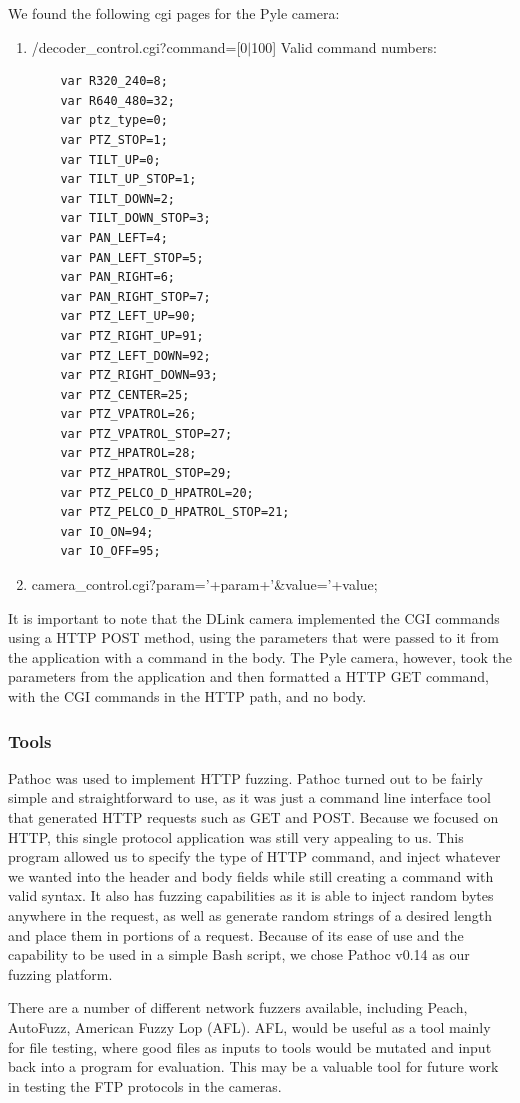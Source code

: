 \documentclass[letterpaper,twocolumn,10pt]{article}
\begin{document}
We found the following cgi pages for the Pyle camera:
\begin{enumerate}
	\item /decoder\_control.cgi?command=[0$\mid$100]
	\newline Valid command numbers:
	\begin{verbatim}
	var R320_240=8;
	var R640_480=32;
	var ptz_type=0;	
	var PTZ_STOP=1;
	var TILT_UP=0;
	var TILT_UP_STOP=1;
	var TILT_DOWN=2;
	var TILT_DOWN_STOP=3;
	var PAN_LEFT=4;
	var PAN_LEFT_STOP=5;
	var PAN_RIGHT=6;
	var PAN_RIGHT_STOP=7;
	var PTZ_LEFT_UP=90;
	var PTZ_RIGHT_UP=91;
	var PTZ_LEFT_DOWN=92;
	var PTZ_RIGHT_DOWN=93;
	var PTZ_CENTER=25;
	var PTZ_VPATROL=26;
	var PTZ_VPATROL_STOP=27;
	var PTZ_HPATROL=28;
	var PTZ_HPATROL_STOP=29;
	var PTZ_PELCO_D_HPATROL=20;
	var PTZ_PELCO_D_HPATROL_STOP=21;
	var IO_ON=94;
	var IO_OFF=95;
	\end{verbatim}
	\item camera\_control.cgi?param='+param+'\&value='+value; 
\end{enumerate}

It is important to note that the DLink camera implemented the CGI commands using a HTTP POST method, using the parameters that were passed to it from the application with a command in the body. The Pyle camera, however, took the parameters from the application and then formatted a HTTP GET command, with the CGI commands in the HTTP path, and no body.


\subsubsection{Tools}
Pathoc was used to implement HTTP fuzzing. Pathoc turned out to be fairly simple and straightforward to use, as it was just a command line interface tool that generated HTTP requests such as GET and POST. Because we focused on HTTP, this single protocol application was still very appealing to us. This program allowed us to specify the type of HTTP command, and inject whatever we wanted into the header and body fields while still creating a command with valid syntax. It also has fuzzing capabilities as it is able to inject random bytes anywhere in the request, as well as generate random strings of a desired length and place them in portions of a request. Because of its ease of use and the capability to be used in a simple Bash script, we chose Pathoc v0.14 as our fuzzing platform.

There are a number of different network fuzzers available, including Peach, AutoFuzz, American Fuzzy Lop (AFL). AFL, would be useful as a tool mainly for file testing, where good files as inputs to tools would be mutated and input back into a program for evaluation. This may be a valuable tool for future work in testing the FTP protocols in the cameras.
\end{document}
